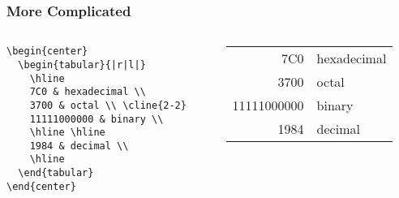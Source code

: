 \begin{frame}[fragile]
\frametitle{More Complicated}

  \begin{columns}
    \begin{column}{.5\textwidth}
      \begin{scriptsize}
\begin{verbatim}
\begin{center}
  \begin{tabular}{|r|l|}
    \hline
    7C0 & hexadecimal \\
    3700 & octal \\ \cline{2-2}
    11111000000 & binary \\
    \hline \hline
    1984 & decimal \\
    \hline
  \end{tabular}
\end{center}
\end{verbatim}
      \end{scriptsize}
    \end{column}

    \begin{column}{.5\textwidth}
      \begin{center}
        \begin{tabular}{|r|l|}
          \hline
          7C0 & hexadecimal \\
          3700 & octal \\ \cline{2-2}
          11111000000 & binary \\
          \hline \hline
          1984 & decimal \\
          \hline
        \end{tabular}
      \end{center}
    \end{column}
  \end{columns}

\end{frame}
